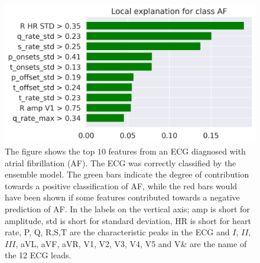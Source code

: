 


\begin{figure}[!htp]
    \centering
    \includegraphics[width=.90\textwidth]{Figures/Atrialfib.png}
    \caption{The figure shows the top $10$ features from an ECG diagnosed with atrial fibrillation (AF). The ECG was correctly classified by the ensemble model. The green bars indicate the degree of contribution towards a positive classification of AF, while the red bars would have been shown if some features contributed towards a negative prediction of AF.
    In the labels on the vertical axis; amp is short for amplitude, std is short for standard deviation, HR is short for heart rate, P, Q, R,S,T are the characteristic peaks in the ECG and $I$, $II$, $III$, aVL, aVF, aVR, V1, V2, V3, V4, V5 and V& are the name of the 12 ECG leads.}
    \label{fig:explainability_rand_12}
\end{figure}








